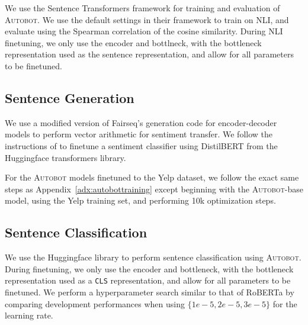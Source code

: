 We use the Sentence Transformers framework for training and evaluation of \textsc{Autobot}. We use the default settings in their framework to train on NLI, and evaluate using the Spearman correlation of the cosine similarity. During NLI finetuning, we only use the encoder and bottlneck, with the bottleneck representation used as the sentence representation, and allow for all parameters to be finetuned.

\subsection{Sentence Generation}

We use a modified version of Fairseq's generation code for encoder-decoder models to perform vector arithmetic for sentiment transfer. We follow the instructions of \citet{mai2020plug} to finetune a sentiment classifier using DistilBERT from the Huggingface transformers library.

For the \textsc{Autobot} models finetuned to the Yelp dataset, we follow the exact same steps as Appendix~\ref{adx:autobottraining} except beginning with the \textsc{Autobot}-base model, using the Yelp training set, and performing 10k optimization steps.

\subsection{Sentence Classification}

We use the Huggingface library to perform sentence classification using \textsc{Autobot}.  During finetuning, we only use the encoder and bottleneck, with the bottleneck representation used as a \texttt{CLS} representation, and allow for all parameters to be finetuned. We perform a hyperparameter search similar to that of RoBERTa by comparing development performances when using $\{1e-5, 2e-5, 3e-5\}$ for the learning rate.

